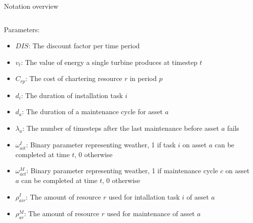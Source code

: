 \documentclass{beamer}
\begin{document}
\begin{frame}{Notation overview}
\begin{columns}
\begin{column}{.48\textwidth}
Parameters:
\begin{itemize}
\item $DIS$: The discount factor per time period
\item $v_t$: The value of energy a single turbine produces at timestep $t$
\item $C_{rp}$: The cost of chartering resource $r$ in period $p$
\item $d_i$: The duration of installation task $i$
\item $d_a$: The duration of a maintenance cycle for asset $a$
\item $\lambda_a$: The number of timesteps after the last maintenance before asset $a$ fails
\item $\omega^I_{ait}$: Binary parameter representing weather, 1 if task $i$ on asset $a$ can be completed at time $t$, 0 otherwise
\item $\omega^M_{act}$: Binary parameter representing weather, 1 if maintenance cycle $c$ on asset $a$ can be completed at time $t$, 0 otherwise
\item $\rho^I_{air}$: The amount of resource $r$ used for intallation task $i$ of asset $a$
\item $\rho^M_{ar}$: The amount of resource $r$ used for maintenance of asset $a$
\end{itemize}
\end{column}
\end{columns}

\end{frame}
\end{document}

